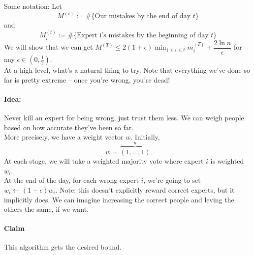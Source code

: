 \documentclass[11pt]{article}
\begin{document}
Some notation:
Let 
\begin{equation}
M^{(t)} := \#\{\text{Our mistakes by the end of day }t\}
\end{equation}
and 
\begin{equation}
M_i^{(t)} := \#\{\text{Expert i's mistakes by the beginning of day }t\}
\end{equation}
We will show that we can get $M^{(T)}\le 2(1+\epsilon)\displaystyle\min_{1\le i\le t} m_i^{(T)} + \dfrac{2\ln n}{\epsilon}$ for any $\epsilon\in (0, \frac{1}{2})$.\medskip\\
At a high level, what's a natural thing to try. Note that everything we've done so far is pretty extreme -- once you're wrong, you're dead!
\paragraph{Idea:} Never kill an expert for being wrong, just trust them less. We can weigh people based on how accurate they've been so far.\medskip\\
More precisely, we have a weight vector $w$. Initially, 
\begin{equation}
w = \overbrace{(1,\ldots,1)}^n
\end{equation}
At each stage, we will take a weighted majority vote where expert $i$ is weighted $w_i$. \medskip\\
At the end of the day, for each wrong expert $i$, we're going to set $w_i \leftarrow (1-\epsilon)w_i$. Note: this doesn't explicitly reward correct experts, but it implicitly does. We can imagine increasing the correct people and leving the others the same, if we want.
\paragraph{Claim} This algorithm gets the desired bound.
\end{document}
